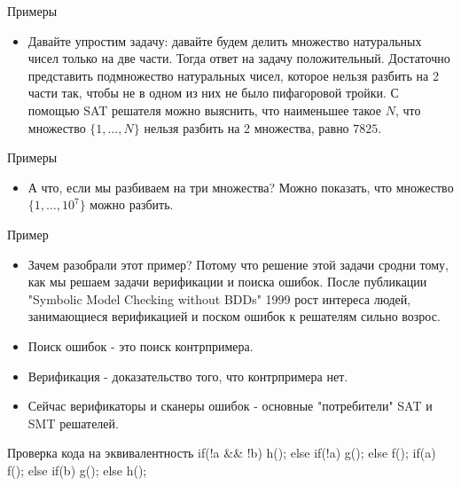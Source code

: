 \documentclass{beamer}
\begin{document}
\begin{frame}{Примеры}
\begin{itemize}
\item Давайте упростим задачу: давайте будем делить множество натуральных чисел только на две части. Тогда ответ на задачу
положительный. Достаточно представить подмножество натуральных чисел, которое нельзя разбить на 2 части так, чтобы не в одном
из них не было пифагоровой тройки. С помощью SAT решателя можно выяснить, что наименьшее такое $N$, что множество
$\{1, \dots, N\}$ нельзя разбить на 2 множества, равно $7825$.
\end{itemize}
\end{frame}

\begin{frame}{Примеры}
\begin{itemize}
\item А что, если мы разбиваем на три множества? Можно показать, что множество $\{1, \dots, 10^7\}$ можно разбить.
\end{itemize}
\end{frame}

\begin{frame}{Пример}
\begin{itemize}
\item Зачем разобрали этот пример? Потому что решение этой задачи сродни тому, как мы решаем задачи верификации и поиска ошибок.
После публикации "Symbolic Model Checking without BDDs" 1999 рост интереса людей, занимающиеся верификацией и поском ошибок к
решателям сильно возрос.
\item Поиск ошибок - это поиск контрпримера.
\item Верификация - доказательство того, что контрпримера нет.
\item Сейчас верификаторы и сканеры ошибок - основные "потребители" SAT и SMT решателей.
\end{itemize}
\end{frame}

\begin{frame}{Проверка кода на эквивалентность}
if(!a \&\& !b) h();\newline
else if(!a) g();\newline
else f();\newline
\newline
if(a) f();\newline
else if(b) g();\newline
else h();
\end{frame}
\end{document}
